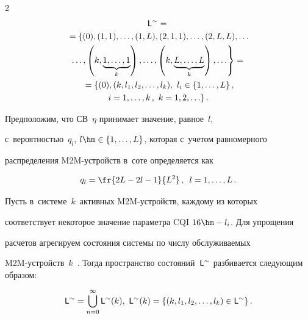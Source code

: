 \begin{multicols}{2}
\begin{multline*}
  {\sf L}^{\sim}={}\\


  {}=\left\{ (0), (1,1),\ldots , (1,L), (2,1,1), \ldots , (2,L,L),\ldots\right.\\


\left.  \ldots , 


\left(k, \underbrace{1,\ldots , 1}_{k}\right), \ldots ,  \left( k, \underbrace{L,\ldots 


,L}_{k}\right), \ldots\right\}={}\\


  {}= \{ (0), (k, l_1, l_2,\ldots , l_k),\ l_i\in \{1,\ldots , L\}\,,\\


   i=1,\ldots , k\,,\ 


k=1,2,\ldots\}\,.




  \end{multline*}


  


  Предположим, что СВ~$\eta$ принимает значение, равное~$l$, 


с~вероятностью~$q_l$, $l\hm\in \{1,\ldots ,L\}$, которая с~учетом равномерного 


распределения M2M-устройств в~соте определяется как 


$$


q_l= \fr{2L-2l- 1}{L^2}\,, \enskip l=1,\ldots , L\,.


$$


  


  Пусть в~системе~$k$~активных M2M-устройств, каж\-до\-му из которых 


соответствует некоторое значение параметра CQI $16\hm- l_i$. Для упрощения 


расчетов агрегируем состояния системы по числу обслуживаемых  


M2M-устройств~$k$~\cite{13-gud}. Тогда пространство состояний~${\sf 


L}^{\sim}$ разбивается следующим образом: 


  $$


  {\sf L}^{\sim} = \mathop{\bigcup}\limits_{n=0}^\infty {\sf L}^{\sim}(k),\ 


  {\sf  L}^{\sim}(k)= \left\{ \left(k, l_1, l_2, \ldots , l_k\right) \in 


  {\sf L}^{\sim}\right\}.


  $$






\end{multicols}
